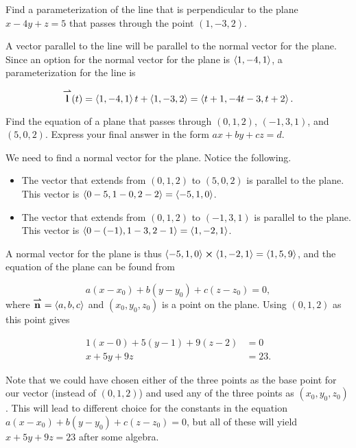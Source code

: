 \documentclass[noauthor]{ximera}
\begin{document}
\begin{problem}
Find a parameterization of the line that is perpendicular to the plane $x-4y+z=5$ that passes through the point $(1,-3,2)$.

\begin{freeResponse}
A vector parallel to the line will be parallel to the normal vector for the plane.  Since an option for the normal vector for the plane is $\left\langle 1,-4,1\right\rangle$, a parameterization for the line is

\[
{\overset{\boldsymbol{\rightharpoonup}}{\mathbf{l}}}(t) = \left\langle 1,-4,1\right\rangle t+\left\langle 1,-3,2\right\rangle = \left\langle t+1,-4t-3,t+2\right\rangle.
\]

\end{freeResponse}
\end{problem}
\begin{problem}
Find the equation of a plane that passes through $(0,1,2)$, $(-1,3,1)$, and $(5,0,2)$.  Express your final answer in the form $ax+by+cz=d$.

\begin{freeResponse}
We need to find a normal vector for the plane.  Notice the following.

\begin{itemize}
\item The vector that extends from $(0,1,2)$ to $(5,0,2)$ is parallel to the plane.  This vector is $\left\langle 0-5, 1- 0, 2-2\right\rangle = \left\langle -5,1,0\right\rangle$.
\item The vector that extends from $(0,1,2)$ to $(-1,3,1)$ is parallel to the plane.  This vector is $\left\langle 0-(-1), 1- 3, 2-1\right\rangle = \left\langle 1,-2,1\right\rangle$.
\end{itemize}

A normal vector for the plane is thus $\left\langle -5,1,0\right\rangle \boldsymbol\times \left\langle 1,-2,1\right\rangle = \left\langle 1,5,9\right\rangle$, and the equation of the plane can be found from

\[
a(x-x_0)+b(y-y_0)+c(z-z_0) = 0,
\]
where ${\overset{\boldsymbol{\rightharpoonup}}{\mathbf{n}}} = \left\langle a,b,c\right\rangle$ and $(x_0,y_0,z_0)$ is a point on the plane.  Using $(0,1,2)$ as this point gives

\begin{align*}
1(x-0)+5(y-1)+9(z-2) &= 0 \\
x+5y+9z &= 23.
\end{align*}

\begin{remark}
Note that we could have chosen either of the three points as the base point for our vector (instead of $(0,1,2)$) and used any of the three points as $(x_0,y_0,z_0)$.  This will lead to different choice for the constants in the equation $a(x-x_0)+b(y-y_0)+c(z-z_0) = 0$, but all of these will yield $x+5y+9z = 23$ after some algebra.
\end{remark}
\end{freeResponse}
\end{problem}
\end{document}
